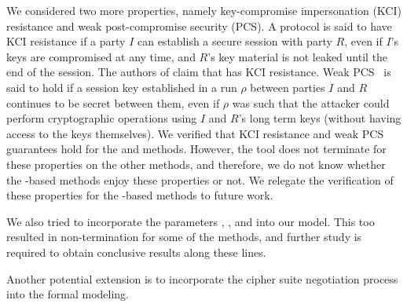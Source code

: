 \documentclass[runningheads, envcountsame, hidelinks, a4paper, x11names]{llncs}
\begin{document}
We considered two more properties, namely key-compromise impersonation (KCI) resistance and weak post-compromise security (PCS). A protocol is said to have KCI resistance if a party $I$ can establish a secure session with party $R$, even if $I$'s keys are compromised at any time, and $R$'s key material is not leaked until the end of the session. The authors of \mSpec{} claim that \mEdhoc{} has KCI resistance. Weak PCS~\cite{cohn2016post} is said to hold if a session key established in a run $\rho$ between parties $I$ and $R$ continues to be secret between them, even if $\rho$ was such that the attacker could perform cryptographic operations using $I$ and $R$'s long term keys (without having access to the keys themselves). We verified that KCI resistance and weak PCS guarantees hold for the \mSigSig{} and \mPskPsk{} methods.
However, the tool does not terminate for these properties on the other methods, and therefore, we do not know whether the \mStat-based methods enjoy these properties or not. We relegate the verification of these properties for the \mStat-based methods to future work. 

We also tried to incorporate the parameters \mCi, \mCr, and \mAD{} into our model. This too resulted in non-termination for some of the methods, and further study is required to obtain conclusive results along these lines. 

Another potential extension is to incorporate the cipher suite negotiation process into the formal modeling.\\ 
%

%




\end{document}
